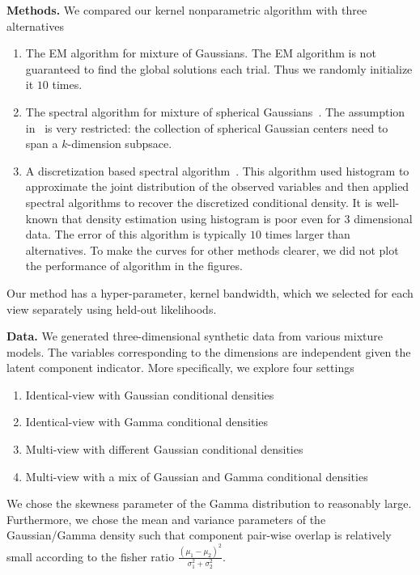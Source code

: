 \documentclass{article}
\begin{document}
{\bf Methods.} We compared our kernel nonparametric algorithm with three alternatives
\begin{enumerate}
  \item The EM algorithm for mixture of Gaussians. The EM algorithm is not guaranteed to find the global solutions each trial. Thus we randomly initialize it $10$ times.
  \item The spectral algorithm for mixture of spherical Gaussians~\citep{Hsu13}. The assumption in~\citet{Hsu13} is very restricted: the collection of spherical Gaussian centers need to span a $k$-dimension subpsace.
  \item A discretization based spectral algorithm~\citep{Hiroyuki10}. This algorithm used histogram to approximate the joint distribution of the observed variables and then applied spectral algorithms to recover the discretized conditional density. It is well-known that density estimation using histogram is poor even for 3 dimensional data. The error of this algorithm is typically $10$ times larger than alternatives. To make the curves for other methods clearer, we did not plot the performance of \citet{Hiroyuki10} algorithm in the figures.
\end{enumerate}
Our method has a hyper-parameter, kernel bandwidth, which we selected for each view separately using held-out likelihoods.

{\bf Data.} We generated three-dimensional synthetic data from various mixture models. The variables corresponding to the dimensions are independent given the latent component indicator. More specifically, we explore four settings
\begin{enumerate}
  \item Identical-view with Gaussian conditional densities
  \item Identical-view with Gamma conditional densities
  \item Multi-view with different Gaussian conditional densities
  \item Multi-view with a mix of Gaussian and Gamma conditional densities
\end{enumerate}
We chose the skewness parameter of the Gamma distribution to reasonably large. Furthermore, we chose the mean and variance parameters of the Gaussian/Gamma density such that component pair-wise overlap is relatively small according to the fisher ratio $\frac{(\mu_1 - \mu_2)^2}{\sigma_1^2+\sigma_2^2}$.
\end{document}
